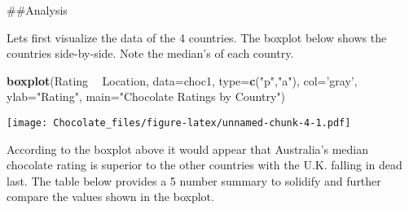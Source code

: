 \documentclass[]{article}
\newenvironment{Shaded}{\begin{snugshade}}{\end{snugshade}}
\newcommand{\DataTypeTok}[1]{\textcolor[rgb]{0.13,0.29,0.53}{#1}}
\newcommand{\FloatTok}[1]{\textcolor[rgb]{0.00,0.00,0.81}{#1}}
\newcommand{\KeywordTok}[1]{\textcolor[rgb]{0.13,0.29,0.53}{\textbf{#1}}}
\newcommand{\NormalTok}[1]{#1}
\newcommand{\OperatorTok}[1]{\textcolor[rgb]{0.81,0.36,0.00}{\textbf{#1}}}
\newcommand{\StringTok}[1]{\textcolor[rgb]{0.31,0.60,0.02}{#1}}
\begin{document}
\#\#Analysis

\begin{Shaded}
\end{Shaded}

Lets first visualize the data of the 4 countries. The boxplot below
shows the countries side-by-side. Note the median's of each country.

\begin{Shaded}
\begin{Highlighting}[]
\KeywordTok{boxplot}\NormalTok{(Rating }\OperatorTok{~}\StringTok{ }\NormalTok{Location, }\DataTypeTok{data=}\NormalTok{choc1, }\DataTypeTok{type=}\KeywordTok{c}\NormalTok{(}\StringTok{"p"}\NormalTok{,}\StringTok{"a"}\NormalTok{), }\DataTypeTok{col=}\StringTok{'gray'}\NormalTok{, }\DataTypeTok{ylab=}\StringTok{"Rating"}\NormalTok{, }\DataTypeTok{main=}\StringTok{"Chocolate Ratings by Country"}\NormalTok{)}
\end{Highlighting}
\end{Shaded}

\texttt{[image: Chocolate\_files/figure-latex/unnamed-chunk-4-1.pdf]}

According to the boxplot above it would appear that Australia's median
chocolate rating is superior to the other countries with the U.K.
falling in dead last. The table below provides a 5 number summary to
solidify and further compare the values shown in the boxplot.

\begin{Shaded}
\end{Shaded}
\end{document}
